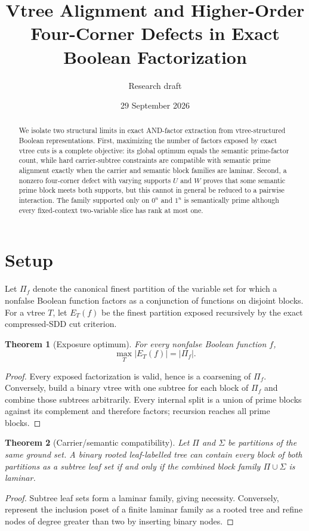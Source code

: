 \documentclass[11pt]{article}
\title{Vtree Alignment and Higher-Order Four-Corner Defects in Exact Boolean Factorization}
\author{Research draft}
\date{29 September 2026}
\newtheorem{theorem}{Theorem}
\begin{document}
\maketitle
\begin{abstract}
We isolate two structural limits in exact AND-factor extraction from vtree-structured Boolean representations. First, maximizing the number of factors exposed by exact vtree cuts is a complete objective: its global optimum equals the semantic prime-factor count, while hard carrier-subtree constraints are compatible with semantic prime alignment exactly when the carrier and semantic block families are laminar. Second, a nonzero four-corner defect with varying supports $U$ and $W$ proves that some semantic prime block meets both supports, but this cannot in general be reduced to a pairwise interaction. The family supported only on $0^n$ and $1^n$ is semantically prime although every fixed-context two-variable slice has rank at most one.
\end{abstract}

\section{Setup}
Let $\Pi_f$ denote the canonical finest partition of the variable set for which a nonfalse Boolean function factors as a conjunction of functions on disjoint blocks. For a vtree $T$, let $E_T(f)$ be the finest partition exposed recursively by the exact compressed-SDD cut criterion.

\begin{theorem}[Exposure optimum]
For every nonfalse Boolean function $f$,
\[
\max_T |E_T(f)|=|\Pi_f|.
\]
\end{theorem}
\begin{proof}
Every exposed factorization is valid, hence is a coarsening of $\Pi_f$. Conversely, build a binary vtree with one subtree for each block of $\Pi_f$ and combine those subtrees arbitrarily. Every internal split is a union of prime blocks against its complement and therefore factors; recursion reaches all prime blocks.
\end{proof}

\begin{theorem}[Carrier/semantic compatibility]
Let $\Pi$ and $\Sigma$ be partitions of the same ground set. A binary rooted leaf-labelled tree can contain every block of both partitions as a subtree leaf set if and only if the combined block family $\Pi\cup\Sigma$ is laminar.
\end{theorem}
\begin{proof}
Subtree leaf sets form a laminar family, giving necessity. Conversely, represent the inclusion poset of a finite laminar family as a rooted tree and refine nodes of degree greater than two by inserting binary nodes.
\end{proof}
\end{document}
